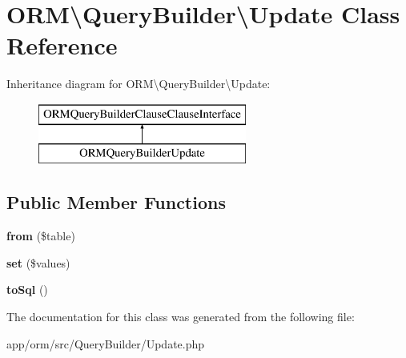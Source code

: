 \hypertarget{classORM_1_1QueryBuilder_1_1Update}{}\section{O\+RM\textbackslash{}Query\+Builder\textbackslash{}Update Class Reference}
\label{classORM_1_1QueryBuilder_1_1Update}
Inheritance diagram for O\+RM\textbackslash{}Query\+Builder\textbackslash{}Update\+:\begin{figure}[H]
\begin{center}
\leavevmode
\includegraphics[height=2.000000cm]{classORM_1_1QueryBuilder_1_1Update}
\end{center}
\end{figure}
\subsection*{Public Member Functions}
\begin{DoxyCompactItemize}
\item 
{\bfseries from} (\$table)\hypertarget{classORM_1_1QueryBuilder_1_1Update_a627f95aa098ccd1fef6020e400304b0c}{}\label{classORM_1_1QueryBuilder_1_1Update_a627f95aa098ccd1fef6020e400304b0c}

\item 
{\bfseries set} (\$values)\hypertarget{classORM_1_1QueryBuilder_1_1Update_a55a6e2addd302018fb1fbf2581b2d209}{}\label{classORM_1_1QueryBuilder_1_1Update_a55a6e2addd302018fb1fbf2581b2d209}

\item 
{\bfseries to\+Sql} ()\hypertarget{classORM_1_1QueryBuilder_1_1Update_a65eb228cb7cc55c85920fee639e40c57}{}\label{classORM_1_1QueryBuilder_1_1Update_a65eb228cb7cc55c85920fee639e40c57}

\end{DoxyCompactItemize}


The documentation for this class was generated from the following file\+:\begin{DoxyCompactItemize}
\item 
app/orm/src/\+Query\+Builder/Update.\+php\end{DoxyCompactItemize}
